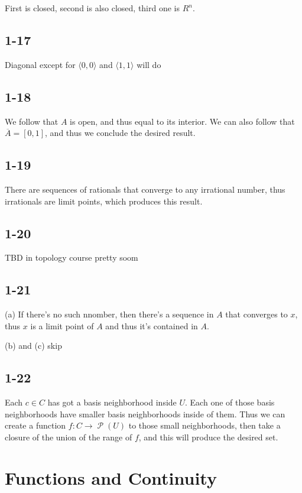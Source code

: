 \documentclass[11pt,oneside,titlepage]{book}
\DeclareMathOperator \pow {\mathcal {P}}
\newcommand{\eangle}[1]{\langle #1 \rangle}
\begin{document}
First is closed, second is also closed, third one is $R^n$.

\subsection*{1-17}

Diagonal except for $\eangle{0, 0}$ and $\eangle{1, 1}$ will do

\subsection*{1-18}

We follow that $A$ is open, and thus equal to its interior. We can also follow that
$\overline{A} = [0, 1]$, and thus we conclude the desired result.

\subsection*{1-19}

There are sequences of rationals that converge to any irrational number, thus irrationals
are limit points, which produces this result.

\subsection*{1-20}

TBD in topology course pretty soom

\subsection*{1-21}

(a) If there's no such nnomber, then there's a sequence in $A$ that converges to $x$, thus
$x$ is a limit point of $A$ and thus it's contained in $A$.

(b) and (c) skip

\subsection*{1-22}

Each $c \in C$ has got a basis neighborhood inside $U$. Each one of those basis neighborhoods
have smaller basis neighborhoods inside of them. Thus we can create a function $f: C \to \pow(U)$
to those small neighborhoods, then take a closure of the union of the range of $f$,
and this will produce the desired set.

\section{Functions and Continuity}
\end{document}
